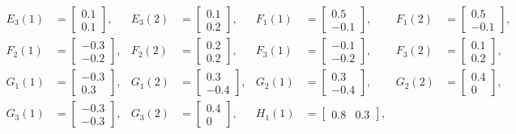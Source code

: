 \documentclass[11pt,draftcls,onecolumn]{IEEEtran}
\begin{document}
\begin{align*}
  E_3(1)&=  \begin{bmatrix}0.1\\0.1\end{bmatrix},
   & E_3(2)&=  \begin{bmatrix}0.1\\0.2\end{bmatrix},
 &F_1(1)&=  \begin{bmatrix}0.5\\-0.1\end{bmatrix},
   & F_1(2)&=  \begin{bmatrix}0.5\\-0.1\end{bmatrix},\\
 F_2(1)&=  \begin{bmatrix}-0.3\\-0.2\end{bmatrix},
   &F_2(2)&=  \begin{bmatrix}0.2\\0.2\end{bmatrix},
  &F_3(1)&=  \begin{bmatrix}-0.1\\-0.2\end{bmatrix},
  & F_3(2)&=  \begin{bmatrix}0.1\\0.2\end{bmatrix},\\
G_1(1)&=  \begin{bmatrix}-0.3\\0.3\end{bmatrix},
  & G_1(2)&=  \begin{bmatrix}0.3\\-0.4\end{bmatrix},
 & G_2(1)&=  \begin{bmatrix}0.3\\-0.4\end{bmatrix},
   &G_2(2)&=  \begin{bmatrix}0.4\\0\end{bmatrix},\\
  G_3(1)&=  \begin{bmatrix}-0.3\\-0.3\end{bmatrix},
  & G_3(2)&=  \begin{bmatrix}0.4\\0\end{bmatrix},
   &H_1(1)&=\begin{bmatrix}0.8 &   0.3\end{bmatrix},

\end{align*}
\end{document}
